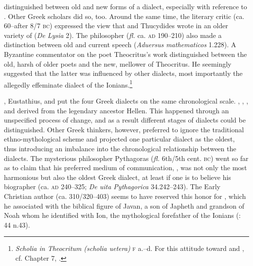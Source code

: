  distinguished between old and new forms of a dialect, especially with reference to . Other Greek scholars did so, too. Around the same time, the literary critic  (ca. 60–after 8/7 \textsc{bc}) expressed the view that  and Thucydides wrote in an older variety of  (\textit{De Lysia} 2). The philosopher  (\textit{fl.} ca. \textsc{ad} 190–210) also made a distinction between old and current  speech (\textit{Aduersus mathematicos} 1.228). A Byzantine commentator on the  poet Theocritus’s work distinguished between the old, harsh  of older poets and the new, mellower  of Theocritus. He seemingly suggested that the latter was influenced by other dialects, most importantly the allegedly effeminate dialect of the Ionians.\footnote{\textit{Scholia in Theocritum (scholia uetera)} \textsc{f} a.–d. For this attitude toward  and , cf. Chapter 7, .}

, Eustathius, and  put the four Greek dialects on the same chronological scale. , , , and  derived from the legendary ancestor Hellen. This happened through an unspecified process of change, and as a result different stages of dialects could be distinguished. Other Greek thinkers, however, preferred to ignore the traditional ethno-mythological scheme and projected one particular dialect as the oldest, thus introducing an imbalance into the chronological relationship between the dialects. The mysterious philosopher Pythagoras (\textit{fl.} 6th/5th cent. \textsc{bc}) went so far as to claim that his preferred medium of communication, , was not only the most harmonious but also the oldest Greek dialect, at least if one is to believe his biographer  (ca. \textsc{ad} 240–325; \textit{De uita Pythagorica} 34.242–243). The Early Christian author  (ca. 310/320–403) seems to have reserved this honor for , which he associated with the biblical figure of Javan, a son of Japheth and grandson of Noah whom he identified with Ion, the mythological forefather of the Ionians (\citealt{VanRooy2013}: 44 n.43).

